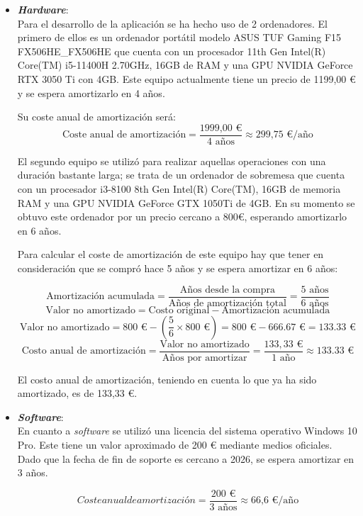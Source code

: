 \begin{itemize}
	\item \textbf{\textit{Hardware}}:\\ Para el desarrollo de la aplicación se ha hecho uso de 2 ordenadores. El primero de ellos es un ordenador portátil modelo ASUS TUF Gaming F15 FX506HE\_FX506HE que cuenta con un procesador 11th Gen Intel(R) Core(TM) i5-11400H 2.70GHz, 16GB de RAM y una GPU NVIDIA GeForce RTX 3050 Ti con 4GB. Este equipo actualmente tiene un precio de 1199,00 € y se espera amortizarlo en 4 años.
	
	Su coste anual de amortización será:
	\[
	\text{Coste anual de amortización} = \frac{\text{1999,00 €}}{\text{4 años}} \approx \text{299,75 €/año}
	\]
	
	 El segundo equipo se utilizó para realizar aquellas operaciones con una duración bastante larga; se trata de un ordenador de sobremesa que cuenta con un procesador i3-8100 8th Gen Intel(R) Core(TM), 16GB de memoria RAM y una GPU NVIDIA GeForce GTX 1050Ti de 4GB. En su momento se obtuvo este ordenador por un precio cercano a 800€, esperando amortizarlo en 6 años.
	
	Para calcular el coste de amortización de este equipo hay que tener en consideración que se compró hace 5 años y se espera amortizar en 6 años:
	

\[
\text{Amortización acumulada} = \frac{\text{Años desde la compra}}{\text{Años de amortización total}} = \frac{5 \text{ años}}{6 \text{ años}}
\]
\[
\text{Valor no amortizado} = \text{Costo original} - \text{Amortización acumulada}
\]
\[
\text{Valor no amortizado} = 800 \text{ €} - \left(\frac{5}{6} \times 800 \text{ €}\right) = 800 \text{ €} - 666.67 \text{ €} = 133.33 \text{ €}
\]
\[
\text{Costo anual de amortización} = \frac{\text{Valor no amortizado}}{\text{Años por amortizar}} = \frac{133,33 \text{ €}}{1 \text{ año}} \approx 133.33 \text{ €}
\]

El costo anual de amortización, teniendo en cuenta lo que ya ha sido amortizado, es de 133,33 €.

\item \textbf{\textit{Software}}:\\

En cuanto a \textit{software} se utilizó una licencia del sistema operativo Windows 10 Pro. Este tiene un valor aproximado de 200 € mediante medios oficiales. Dado que la fecha de fin de soporte es cercano a 2026, se espera amortizar en 3 años.

\[
Coste anual de amortización = \frac{\text{200 €}}{\text{3 años}} \approx \text{66,6 €/año}
\]


\end{itemize}
